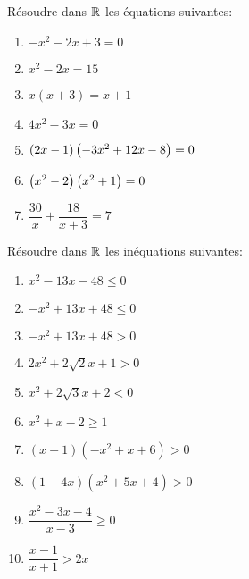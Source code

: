 



 \summary{}
 
	\begin{exercice}
Résoudre dans $ \mathbb{R} $ les équations suivantes:
\begin{enumerate}
\item $ -x^{2}-2x+3=0 $
\item $ x^{2}-2x=15 $
\item $ x(x+3)=x+1$
\item $ 4x^{2}-3x =0$
\item $ \left(2x-1\right)\left(-3x^{2}+12x -8\right)=0 $
\item $\left(x^{2}-2\right)\left(x^{2}+1\right)=0 $
\item $\dfrac{30}{x}+\dfrac{18}{x+3}=7 $
\end{enumerate}

\end{exercice}


\begin{exercice}
Résoudre dans $ \mathbb{R} $  les inéquations suivantes:
\begin{enumerate}
\item  $x^{2}-13x-48\leq 0 $
\item  $-x^{2}+13x+48\leq 0 $
\item  $-x^{2}+13x+48> 0 $
\item  $2x^{2}+2\sqrt{2}x+1> 0 $
\item  $x^{2}+2\sqrt{3}x+2< 0 $
\item  $x^{2}+x-2\geq 1 $
\item  $(x+1)(-x^{2}+x+6)> 0 $
\item  $(1-4x)(x^{2}+5x+4)>0 $
\item $ \dfrac{x^{2}-3x-4}{x-3}\geq0 $
\item  $\dfrac{x-1}{x+1}> 2x $
\end{enumerate}
\end{exercice}

